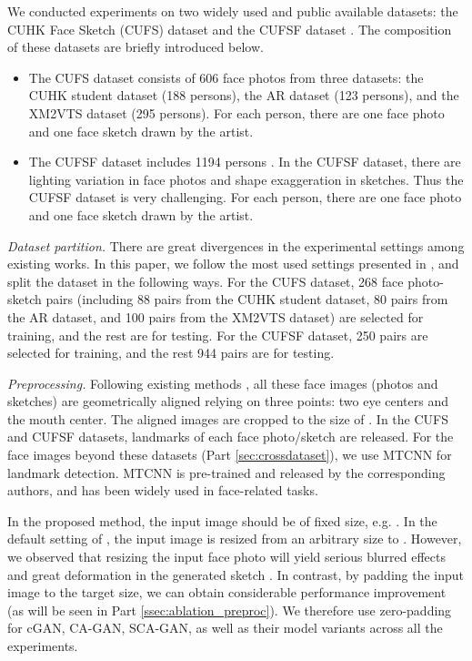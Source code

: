 \documentclass[journal]{IEEEtran}
\begin{document}
We conducted experiments on two widely used and public available datasets: the CUHK Face Sketch (CUFS) dataset \cite{Ref13} and the CUFSF dataset \cite{Ref31}. The composition of these datasets are briefly introduced below.
\begin{itemize}
\item The CUFS dataset consists of 606 face photos from three datasets: the CUHK student dataset \cite{Ref2} (188 persons), the AR dataset \cite{Ref23} (123 persons), and the XM2VTS dataset \cite{Ref24} (295 persons). For each person, there are one face photo and one face sketch drawn by the artist. 
\item The CUFSF dataset includes 1194 persons \cite{Ref32}. In the CUFSF dataset, there are lighting variation in face photos and shape exaggeration in sketches. Thus the CUFSF dataset is very challenging. For each person, there are one face photo and one face sketch drawn by the artist. 
\end{itemize}

\textit{Dataset partition.} There are great divergences in the experimental settings among existing works. In this paper, we follow the most used settings presented in \cite{Wang2017RSLCR}, and split the dataset in the following ways. For the CUFS dataset, 268 face photo-sketch pairs (including 88 pairs from the CUHK student dataset, 80 pairs from the AR dataset, and 100 pairs from the XM2VTS dataset) are selected for training, and the rest are for testing. For the CUFSF dataset, 250 pairs are selected for training, and the rest 944  pairs are for testing. 

\textit{Preprocessing.} Following existing methods \cite{Wang2017RSLCR}, all these face images (photos and sketches) are geometrically aligned relying on three points: two eye centers and the mouth center. The aligned images are cropped to the size of . 
In the CUFS and CUFSF datasets, landmarks of each face photo/sketch are released. For the face images beyond these datasets (Part \ref{sec:crossdataset}), we use MTCNN \cite{Zhang2014MTCNN} for landmark detection. MTCNN is pre-trained and released by the corresponding authors, and has been widely used in face-related tasks. 

In the proposed method, the input image should be of fixed size, e.g. . In the default setting of \cite{Isola2017Pix2Pix}, the input image is resized from an arbitrary size to . However, we observed that resizing the input face photo will yield serious blurred effects and great deformation in the generated sketch \cite{wang2017bpgan} \cite{wang2017multgan}. In contrast, by padding the input image to the target size, we can obtain considerable performance improvement (as will be seen in Part \ref{ssec:ablation_preproc}). 
We therefore use zero-padding for cGAN, CA-GAN, SCA-GAN, as well as their model variants across all the experiments.
\end{document}
